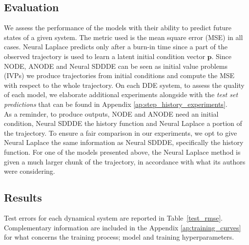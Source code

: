 \documentclass[pmlr]{jmlr}%
\newcommand{\LMcomment}[1]{{\bfseries \color{orange} [LM: #1]}}
\newcommand{\TM}[2]{{\bfseries \color{red} [thib: #1]}}
\begin{document}
\subsection{Evaluation}
\label{ss:evaluation}
We assess the performance of the models with their ability to predict future states of a given system. The metric used is the mean square error (MSE) in all cases. Neural Laplace predicts only after a burn-in time since a part of the observed trajectory is used to learn a latent initial condition vector $\mathbf{p}$. Since NODE, ANODE and Neural SDDDE can be seen as initial value problems (IVPs) we produce trajectories from initial conditions and compute the MSE with respect to the whole trajectory.
On each DDE system, to assess the quality of each model, we elaborate additional experiments alongside with the \textit{test set predictions} that can be found in Appendix \ref{ap:step_history_experiments}.
\\

As a reminder, to produce outputs, NODE and ANODE need an initial condition, Neural SDDDE the history function and Neural Laplace a portion of the trajectory. To ensure a fair comparison in our experiments, we opt to give Neural Laplace the same information as Neural SDDDE, specifically the history function.
For one of the models presented above, the Neural Laplace method is given a much larger chunk of the trajectory, in accordance with what its authors were considering.


\subsection{Results}

Test errors for each dynamical system are reported in Table~\ref{test_rmse}. Complementary information are included in the Appendix \ref{ap:training_curves} for what concerns the training process; model and training hyperparameters.



\end{document}
